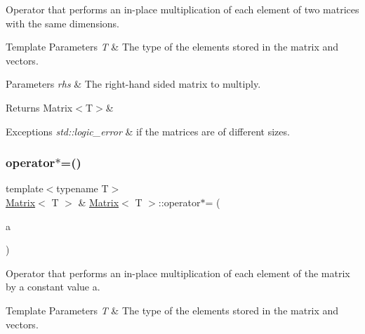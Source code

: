 Operator that performs an in-\/place multiplication of each element of two matrices with the same dimensions. 


\begin{DoxyTemplParams}{Template Parameters}
{\em T} & The type of the elements stored in the matrix and vectors. \\
\hline
\end{DoxyTemplParams}

\begin{DoxyParams}{Parameters}
{\em rhs} & The right-\/hand sided matrix to multiply. \\
\hline
\end{DoxyParams}
\begin{DoxyReturn}{Returns}
Matrix$<$\+T$>$\&
\end{DoxyReturn}

\begin{DoxyExceptions}{Exceptions}
{\em std\+::logic\+\_\+error} & if the matrices are of different sizes. \\
\hline
\end{DoxyExceptions}
\mbox{\label{classMatrix_a9ac358ade86c1b442aa75852b2dd663a}} 
\subsubsection{\texorpdfstring{operator$\ast$=()}{operator*=()}\hspace{0.1cm}{\footnotesize\ttfamily [2/2]}}
{\footnotesize\ttfamily template$<$typename T$>$ \\
\mbox{\hyperlink{classMatrix}{Matrix}}$<$ T $>$ \& \mbox{\hyperlink{classMatrix}{Matrix}}$<$ T $>$\+::operator$\ast$= (\begin{DoxyParamCaption}\item[{const T \&}]{a }\end{DoxyParamCaption})\hspace{0.3cm}{\ttfamily [inline]}}



Operator that performs an in-\/place multiplication of each element of the matrix by a constant value {\ttfamily a}. 


\begin{DoxyTemplParams}{Template Parameters}
{\em T} & The type of the elements stored in the matrix and vectors. \\
\hline
\end{DoxyTemplParams}

